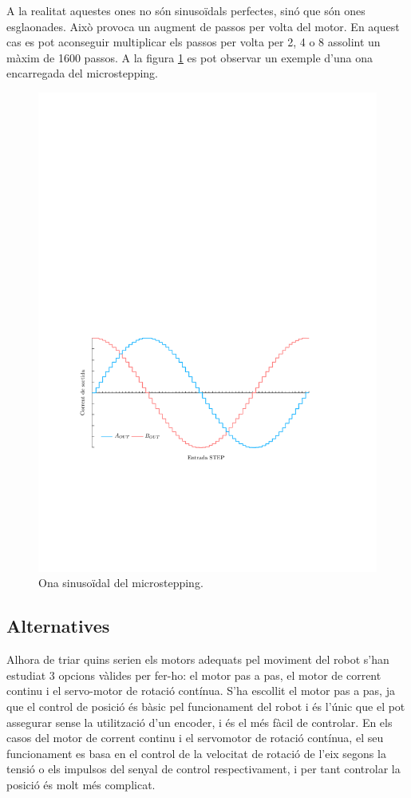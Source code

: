\begin{itemize}
		A la realitat aquestes ones no són sinusoïdals perfectes, sinó que són ones esglaonades. Això provoca un augment de passos per volta del motor. En aquest cas es pot aconseguir multiplicar els passos per volta per 2, 4 o 8 assolint un màxim de 1600 passos. A la figura \ref{fig:Microstepping} es pot observar un exemple d’una ona encarregada del microstepping. 
		
		\begin{figure}[H]
			\centering
			\includegraphics{Multistepper-grafic}
			\caption{Ona sinusoïdal del microstepping.}
			\label{fig:Microstepping}
		\end{figure}
\end{itemize}

\subsection{Alternatives}
Alhora de triar quins serien els motors adequats pel moviment del robot s'han estudiat 3 opcions vàlides per fer-ho: el motor pas a pas, el motor de corrent continu i el servo-motor de rotació contínua. S'ha escollit el motor pas a pas, ja que el control de posició és bàsic pel funcionament del robot i és l'únic que el pot assegurar sense la utilització d'un encoder, i és el més fàcil de controlar. En els casos del motor de corrent continu i el servomotor de rotació contínua, el seu funcionament es basa en el control de la velocitat de rotació de l'eix segons la tensió o els impulsos del senyal de control respectivament, i per tant controlar la posició és molt més complicat. 


